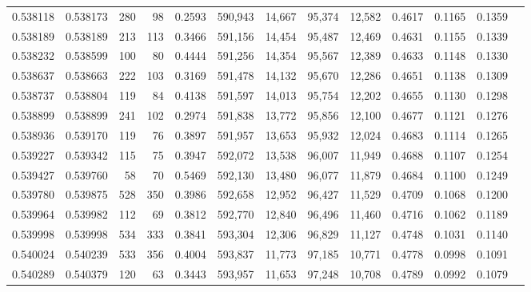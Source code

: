 \begin{tabular}{rrrrrrrrrrrrr}
0.538118 & 0.538173 &   280 &    98 &                                     0.2593 & 590,943 &  14,667 &  95,374 &  12,582 & 0.4617 & 0.1165 & 0.1359 \\
0.538189 & 0.538189 &   213 &   113 &                                     0.3466 & 591,156 &  14,454 &  95,487 &  12,469 & 0.4631 & 0.1155 & 0.1339 \\
0.538232 & 0.538599 &   100 &    80 &                                     0.4444 & 591,256 &  14,354 &  95,567 &  12,389 & 0.4633 & 0.1148 & 0.1330 \\
0.538637 & 0.538663 &   222 &   103 &                                     0.3169 & 591,478 &  14,132 &  95,670 &  12,286 & 0.4651 & 0.1138 & 0.1309 \\
0.538737 & 0.538804 &   119 &    84 &                                     0.4138 & 591,597 &  14,013 &  95,754 &  12,202 & 0.4655 & 0.1130 & 0.1298 \\
0.538899 & 0.538899 &   241 &   102 &                                     0.2974 & 591,838 &  13,772 &  95,856 &  12,100 & 0.4677 & 0.1121 & 0.1276 \\
0.538936 & 0.539170 &   119 &    76 &                                     0.3897 & 591,957 &  13,653 &  95,932 &  12,024 & 0.4683 & 0.1114 & 0.1265 \\
0.539227 & 0.539342 &   115 &    75 &                                     0.3947 & 592,072 &  13,538 &  96,007 &  11,949 & 0.4688 & 0.1107 & 0.1254 \\
0.539427 & 0.539760 &    58 &    70 &                                     0.5469 & 592,130 &  13,480 &  96,077 &  11,879 & 0.4684 & 0.1100 & 0.1249 \\
0.539780 & 0.539875 &   528 &   350 &                                     0.3986 & 592,658 &  12,952 &  96,427 &  11,529 & 0.4709 & 0.1068 & 0.1200 \\
0.539964 & 0.539982 &   112 &    69 &                                     0.3812 & 592,770 &  12,840 &  96,496 &  11,460 & 0.4716 & 0.1062 & 0.1189 \\
0.539998 & 0.539998 &   534 &   333 &                                     0.3841 & 593,304 &  12,306 &  96,829 &  11,127 & 0.4748 & 0.1031 & 0.1140 \\
0.540024 & 0.540239 &   533 &   356 &                                     0.4004 & 593,837 &  11,773 &  97,185 &  10,771 & 0.4778 & 0.0998 & 0.1091 \\
0.540289 & 0.540379 &   120 &    63 &                                     0.3443 & 593,957 &  11,653 &  97,248 &  10,708 & 0.4789 & 0.0992 & 0.1079 \\

\end{tabular}
